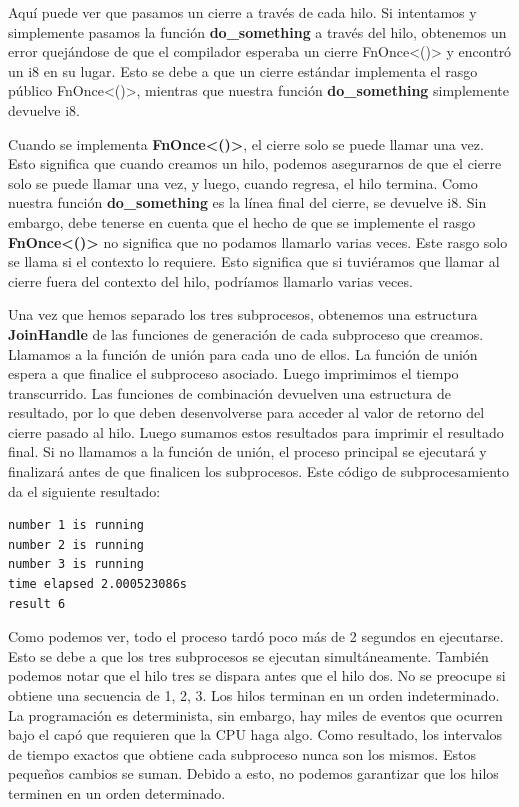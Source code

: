 Aquí puede ver que pasamos un cierre a través de cada hilo. Si intentamos y simplemente pasamos la función \textbf{do\_something} a través del hilo, obtenemos un error quejándose de que el compilador esperaba un cierre FnOnce<()> y encontró un i8 en su lugar. Esto se debe a que un cierre estándar implementa el rasgo público FnOnce<()>, mientras que nuestra función \textbf{do\_something} simplemente devuelve i8.

Cuando se implementa \textbf{FnOnce<()>}, el cierre solo se puede llamar una vez. Esto significa que cuando creamos un hilo, podemos asegurarnos de que el cierre solo se puede llamar una vez, y luego, cuando regresa, el hilo termina. Como nuestra función \textbf{do\_something} es la línea final del cierre, se devuelve i8. Sin embargo, debe tenerse en cuenta que el hecho de que se implemente el rasgo \textbf{FnOnce<()>} no significa que no podamos llamarlo varias veces. Este rasgo solo se llama si el contexto lo requiere. Esto significa que si tuviéramos que llamar al cierre fuera del contexto del hilo, podríamos llamarlo varias veces.

Una vez que hemos separado los tres subprocesos, obtenemos una estructura \textbf{JoinHandle} de las funciones de generación de cada subproceso que creamos. Llamamos a la función de unión para cada uno de ellos. La función de unión espera a que finalice el subproceso asociado. Luego imprimimos el tiempo transcurrido. Las funciones de combinación devuelven una estructura de resultado, por lo que deben desenvolverse para acceder al valor de retorno del cierre pasado al hilo. Luego sumamos estos resultados para imprimir el resultado final. Si no llamamos a la función de unión, el proceso principal se ejecutará y finalizará antes de que finalicen los subprocesos. Este código de subprocesamiento da el siguiente resultado:

\begin{lstlisting}
number 1 is running
number 2 is running
number 3 is running
time elapsed 2.000523086s
result 6
\end{lstlisting}

Como podemos ver, todo el proceso tardó poco más de 2 segundos en ejecutarse. Esto se debe a que los tres subprocesos se ejecutan simultáneamente. También podemos notar que el hilo tres se dispara antes que el hilo dos. No se preocupe si obtiene una secuencia de 1, 2, 3. Los hilos terminan en un orden indeterminado. La programación es determinista, sin embargo, hay miles de eventos que ocurren bajo el capó que requieren que la CPU haga algo. Como resultado, los intervalos de tiempo exactos que obtiene cada subproceso nunca son los mismos. Estos pequeños cambios se suman. Debido a esto, no podemos garantizar que los hilos terminen en un orden determinado.

